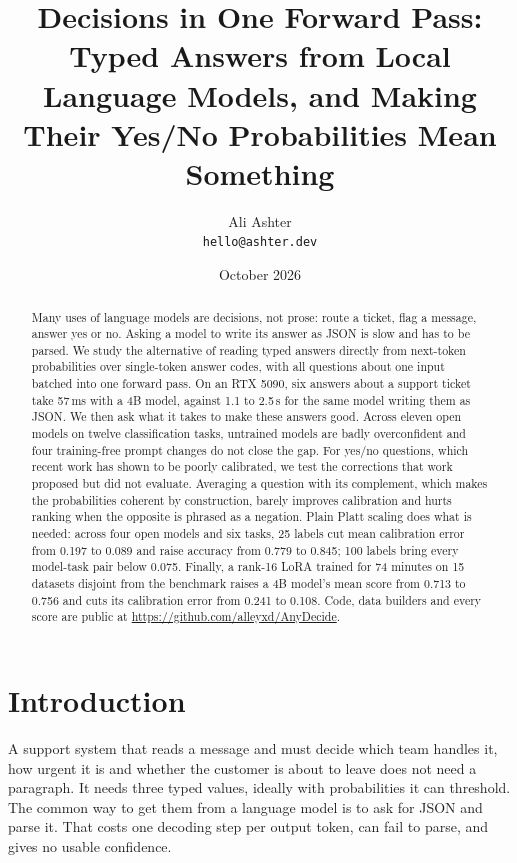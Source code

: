 \documentclass[10pt,twocolumn]{article}
\title{Decisions in One Forward Pass:\\Typed Answers from Local Language Models, and Making\\Their Yes/No Probabilities Mean Something}
\author{Ali Ashter\\\texttt{hello@ashter.dev}}
\date{October 2026}
\begin{document}
\maketitle

\begin{abstract}
Many uses of language models are decisions, not prose: route a ticket, flag a message, answer yes or no. Asking a
model to write its answer as JSON is slow and has to be parsed. We study the alternative of reading typed answers
directly from next-token probabilities over single-token answer codes, with all questions about one input batched
into one forward pass. On an RTX 5090, six answers about a support ticket take 57\,ms with a 4B model, against 1.1 to
2.5\,s for the same model writing them as JSON. We then ask what it takes to make these answers good. Across eleven
open models on twelve classification tasks, untrained models are badly overconfident and four training-free prompt
changes do not close the gap. For yes/no questions, which recent work has shown to be poorly calibrated, we test
the corrections that work proposed but did not evaluate. Averaging a question with its complement, which makes the
probabilities coherent by construction, barely improves calibration and hurts ranking when the opposite is
phrased as a negation. Plain Platt scaling does what is needed: across four open models and six tasks, 25 labels cut
mean calibration error from 0.197 to 0.089 and raise accuracy from 0.779 to 0.845; 100 labels bring every
model-task pair below 0.075. Finally, a rank-16 LoRA trained for 74 minutes on 15 datasets disjoint
from the benchmark raises a 4B model's mean score from 0.713 to 0.756 and cuts its calibration error from 0.241 to
0.108. Code, data builders and every score are public at \url{https://github.com/alleyxd/AnyDecide}.
\end{abstract}

\section{Introduction}

A support system that reads a message and must decide which team handles it, how urgent it is and whether the
customer is about to leave does not need a paragraph. It needs three typed values, ideally with probabilities it can
threshold. The common way to get them from a language model is to ask for JSON and parse it. That costs one decoding
step per output token, can fail to parse, and gives no usable confidence.
\end{document}
